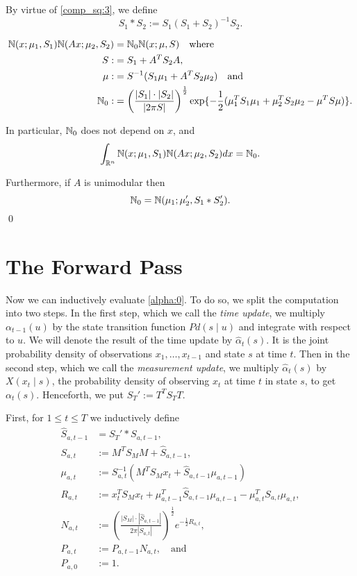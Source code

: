 \documentclass[12pt,leqno]{article}
\begin{document}
By virtue of \eqref{comp_sq:3}, we define
$$
S_1*S_2 := S_1(S_1+S_2)^{-1}S_2.
$$

\begin{Cor}\label{comp_sq:2}
\begin{align*}
  {\mathbb N}(x;\mu_1,S_1){\mathbb N}(Ax;\mu_2,S_2) &= {\mathbb N}_0{\mathbb N}(x;\mu,S)\quad\text{where}\\
  S :&= S_1+A^TS_2A,\\
  \mu :&= S^{-1}(S_1\mu_1 + A^TS_2\mu_2)\quad\text{and} \\
  {\mathbb N}_0 :&= \left(\frac{|S_1|\cdot|S_2|}{|2\pi{S}|}\right)^{\frac{1}{2}}\exp\{-\frac{1}{2}(\mu_1^TS_1\mu_1 + \mu_2^TS_2\mu_2-\mu^TS\mu)\}.
\end{align*}

In particular, ${\mathbb N}_0$ does not depend on $x$, and
\begin{equation}\label{comp_sq:int}
  \int_{{\mathbb R}^{n}}  {\mathbb N}(x;\mu_1,S_1){\mathbb N}(Ax;\mu_2,S_2)dx = {\mathbb N}_0.
\end{equation}

Furthermore, if $A$ is unimodular then 
\begin{equation}\label{exact_prod} 
  {\mathbb N}_0 = {\mathbb N}(\mu_1;\mu_2',S_1*S_2').
\end{equation}
\qed
\end{Cor}

\section{The Forward Pass}
  Now we can inductively evaluate \eqref{alpha:0}. To do so, we split the computation
  into two steps.  In the first step, which we call the {\em time update}, we multiply
  $\alpha_{t-1}(u)$ by the state transition function $Pd(s\mid u)$ and integrate with respect
  to $u$. We will denote the result of the time update by $\hat{\alpha}_t(s)$.  It is the joint probability
  density of observations $x_1,\dots,x_{t-1}$ and state $s$ at time $t$.
  Then in the second step, which we call the {\em measurement update}, we multiply
  $\hat{\alpha}_t(s)$ by $X(x_t \mid s)$, the probability density of observing $x_t$ at time $t$
  in state $s$, to get $\alpha_t(s)$.  Henceforth, we put $S_T' := T^TS_TT$.

  First, for $1\le t \le T$ we inductively define
  \begin{align*}
    \hat{S}_{a,t-1} &= S_T'*S_{a,t-1},\\
    S_{a,t} &:= M^TS_MM  + \hat{S}_{a,t-1},\\
    \mu_{a,t} &:= S_{a,t}^{-1}(M^TS_Mx_t + \hat{S}_{a,t-1}\mu_{a,t-1})\\
    R_{a,t} &:= x_t^TS_Mx_t + \mu_{a,t-1}^T\hat{S}_{a,t-1}\mu_{a,t-1} - \mu_{a,t}^TS_{a,t}\mu_{a,t},\\
    N_{a,t} &:= \left(\frac{|S_M|\cdot|\hat{S}_{a,t-1}|}{2\pi|S_{a,t}|}\right)^{\frac{1}{2}}e^{-\frac{1}{2}R_{a,t}},\\
    P_{a,t} &:= P_{a,t-1}N_{a,t}, \quad\text{and}\\
    P_{a,0} &:= 1.
  \end{align*}
\end{document}
